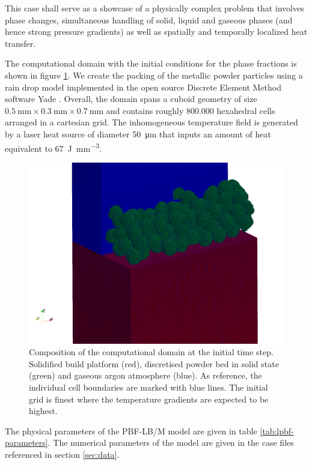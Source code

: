 \documentclass[conference,final]{IEEEtran}
\begin{document}
This case shall serve as a showcase of a physically complex problem that involves phase changes, simultaneous handling of solid, liquid and gaseous phases (and hence strong pressure gradients) as well as spatially and temporally localized heat transfer.

The computational domain with the initial conditions for the phase fractions is shown in figure \ref{fig:lpbf-initial}. We create the packing of the metallic powder particles using a rain drop model implemented in the open source Discrete Element Method software Yade \cite{vaclavsmilauerYadeDocumentation2021}. Overall, the domain spans a cuboid geometry of size $\SI{0.5}{\milli\metre} \times \SI{0.3}{\milli\metre} \times \SI{0.7}{\milli\metre}$ and contains roughly 800.000 hexahedral cells arranged in a cartesian grid. The inhomogeneous temperature field is generated by a laser heat source of diameter \SI{50}{\micro\metre} that inputs an amount of heat equivalent to \SI{67}{\joule \per \milli\metre\cubed}.

\begin{figure}[!tbp]
  \centering
  \includegraphics[width=\linewidth]{Figs/powderbed.png}
  \caption{Composition of the computational domain at the initial time step. Solidified build platform (red), discretised powder bed in solid state (green) and gaseous argon atmosphere (blue). As reference, the individual cell boundaries are marked with blue lines. The initial grid is finest where the temperature gradients are expected to be highest.}
  \label{fig:lpbf-initial}
\end{figure}


The physical parameters of the PBF-LB/M model are given in table \ref{tab:lpbf-parameters}. The numerical parameters of the model are given in the case files referenced in section \ref{sec:data}.
\end{document}
